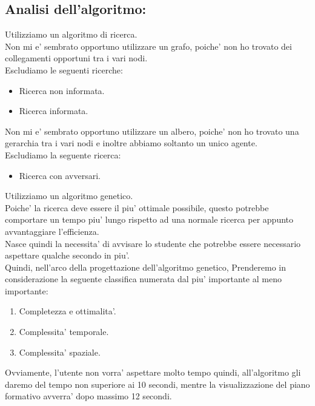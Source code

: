 \documentclass[10pt,a4paper]{article}
\begin{document}
    \subsection{Analisi dell'algoritmo:}
      \label{analisiDellAlgoritmo}
        Utilizziamo un algoritmo di ricerca.\\
        Non mi e' sembrato opportuno utilizzare un grafo, poiche' non ho trovato dei collegamenti opportuni 
        tra i vari nodi.\\
        Escludiamo le seguenti ricerche:
        \begin{itemize}
          \item Ricerca non informata.
          \item Ricerca informata.
        \end{itemize}
        Non mi e' sembrato opportuno utilizzare un albero, poiche' non ho trovato una gerarchia tra i vari nodi e 
        inoltre abbiamo soltanto un unico agente.\\
        Escludiamo la seguente ricerca:
        \begin{itemize}
          \item Ricerca con avversari.
        \end{itemize}
        Utilizziamo un algoritmo genetico.\\
        Poiche' la ricerca deve essere il piu' ottimale possibile, questo 
        potrebbe comportare un tempo piu' lungo rispetto ad una normale ricerca per appunto avvantaggiare l'efficienza.\\
        Nasce quindi la necessita' di avvisare lo studente che potrebbe essere necessario aspettare qualche secondo in piu'.\\
        Quindi, nell'arco della progettazione dell'algoritmo genetico, Prenderemo in considerazione la 
        seguente classifica numerata dal piu' importante al meno importante:
        \begin{enumerate}
          \item Completezza e ottimalita'.
          \item Complessita' temporale.
          \item Complessita' spaziale.
        \end{enumerate}
        Ovviamente, l'utente non vorra' aspettare molto tempo quindi, all'algoritmo gli daremo del tempo 
        non superiore ai 10 secondi, mentre la visualizzazione del piano formativo avverra' dopo massimo 12 secondi. 
\end{document}
